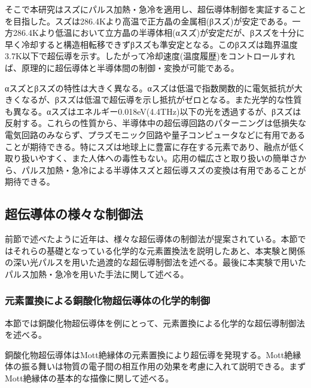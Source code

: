 そこで本研究はスズにパルス加熱・急冷を適用し、超伝導体制御を実証することを目指した。スズは286.4Kより高温で正方晶の金属相(βスズ)が安定である。一方286.4Kより低温において立方晶の半導体相(αスズ)が安定だが、βスズを十分に早く冷却すると構造相転移できずβスズも準安定となる。このβスズは臨界温度3.7K以下で超伝導を示す。したがって冷却速度(温度履歴)をコントロールすれば、原理的に超伝導体と半導体間の制御・変換が可能である。

αスズとβスズの特性は大きく異なる。αスズは低温で指数関数的に電気抵抗が大きくなるが、βスズは低温で超伝導を示し抵抗がゼロとなる。また光学的な性質も異なる。αスズはエネルギー0.018eV(4.4THz)以下の光を透過するが、βスズは反射する。これらの性質から、半導体中の超伝導回路のパターニングは低損失な電気回路のみならず、プラズモニック回路や量子コンピュータなどに有用であることが期待できる。特にスズは地球上に豊富に存在する元素であり、融点が低く取り扱いやすく、また人体への毒性もない。応用の幅広さと取り扱いの簡単さから、パルス加熱・急冷による半導体スズと超伝導スズの変換は有用であることが期待できる。

\subsection{超伝導体の様々な制御法}
前節で述べたように近年は、様々な超伝導体の制御法が提案されている。本節ではそれらの基礎となっている化学的な元素置換法を説明したあと、本実験と関係の深い光パルスを用いた過渡的な超伝導制御法を述べる。最後に本実験で用いたパルス加熱・急冷を用いた手法に関して述べる。

\subsubsection{元素置換による銅酸化物超伝導体の化学的制御}
本節では銅酸化物超伝導体を例にとって、元素置換による化学的な超伝導制御法を述べる。

銅酸化物超伝導体はMott絶縁体の元素置換により超伝導を発現する\cite{Lee2006}。Mott絶縁体の振る舞いは物質の電子間の相互作用の効果を考慮に入れて説明できる。まずMott絶縁体の基本的な描像に関して述べる。


